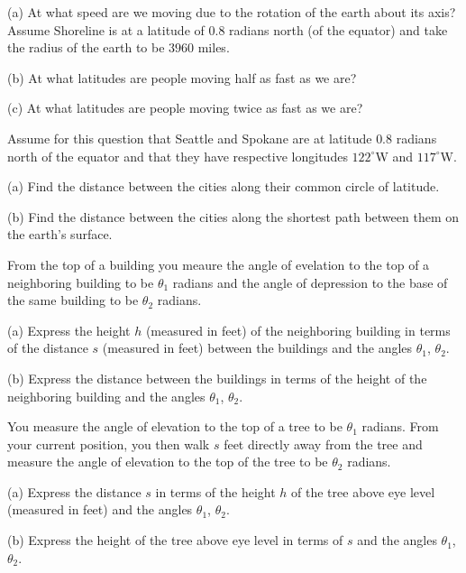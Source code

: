 \documentclass{ximera}
\begin{document}
\begin{question}  \label{Qdegb574}
(a) At what speed are we moving due to the rotation of the earth about its axis? Assume Shoreline is at a latitude of $0.8$ radians
north (of the equator) and take the radius of the earth to be $3960$ miles.

(b) At what latitudes are people moving half as fast as we are?

(c) At what latitudes are people moving twice as fast as we are?

\end{question}

\begin{question} \label{Q34ft45rtg}
Assume for this question that Seattle and Spokane are at latitude $0.8$ radians north of the equator and that they have respective longitudes $122^\circ$W and $117^\circ$W.

(a) Find the distance between the cities along their common circle of latitude.

(b) Find the distance between the cities along the shortest path between them on the earth's surface.

\end{question}


\begin{question}  \label{Qewrdfg67}
From the top of a building you meaure the angle of evelation to the top of a neighboring building to be $\theta_1$ radians and the angle of depression to the base of the same building to be $\theta_2$ radians.

(a) Express the height $h$ (measured in feet) of the neighboring building in terms of the distance $s$ (measured in feet) between the buildings and the angles $\theta_1$, $\theta_2$.

(b) Express the distance between the buildings in terms of the height of the neighboring building and the angles $\theta_1$, $\theta_2$.

\end{question}

\begin{question}  \label{Qerdft543}
You measure the angle of elevation to the top of a tree to be $\theta_1$ radians. From your current position, you then walk $s$ feet directly away from the tree and measure the angle of elevation to the top of the tree to be $\theta_2$ radians.

(a) Express the distance $s$ in terms of the height $h$ of the tree above eye level (measured in feet) and the angles $\theta_1$, $\theta_2$.

(b) Express the height of the tree above eye level in terms of $s$ and the angles $\theta_1$, $\theta_2$.
\end{question}
\end{document}
